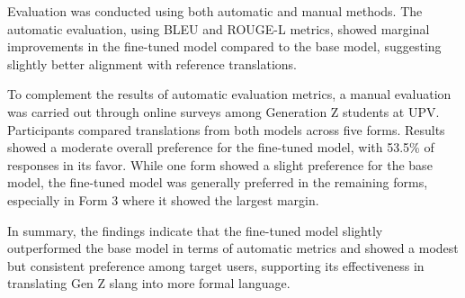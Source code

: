 Evaluation was conducted using both automatic and manual methods. The automatic evaluation, using BLEU and ROUGE-L metrics, showed marginal improvements in the fine-tuned model compared to the base model, suggesting slightly better alignment with reference translations. 

To complement the results of automatic evaluation metrics, a manual evaluation was carried out through online surveys among Generation Z students at UPV. Participants compared translations from both models across five forms. Results showed a moderate overall preference for the fine-tuned model, with 53.5\% of responses in its favor. While one form showed a slight preference for the base model, the fine-tuned model was generally preferred in the remaining forms, especially in Form 3 where it showed the largest margin.

In summary, the findings indicate that the fine-tuned model slightly outperformed the base model in terms of automatic metrics and showed a modest but consistent preference among target users, supporting its effectiveness in translating Gen Z slang into more formal language.